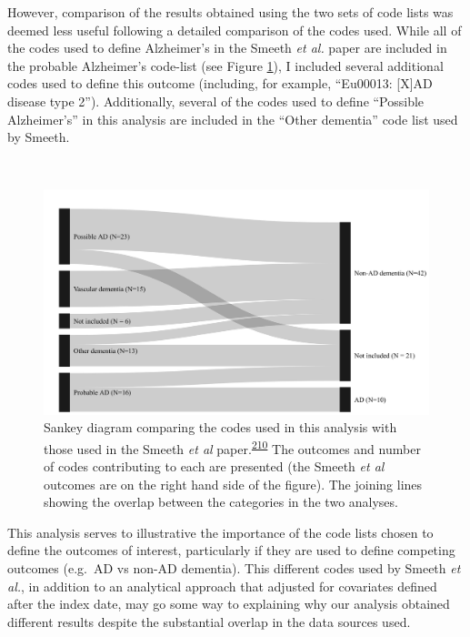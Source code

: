 \documentclass[a4paper, twoside]{templates/ociamthesis}
\begin{document}
However, comparison of the results obtained using the two sets of code lists was deemed less useful following a detailed comparison of the codes used. While all of the codes used to define Alzheimer's in the Smeeth \emph{et al.} paper are included in the probable Alzheimer's code-list (see Figure \ref{fig:smeethComparison}), I included several additional codes used to define this outcome (including, for example, ``Eu00013: {[}X{]}AD disease type 2''). Additionally, several of the codes used to define ``Possible Alzheimer's'' in this analysis are included in the ``Other dementia'' code list used by Smeeth.

~





\begin{figure}[H]
\includegraphics[width=1\linewidth]{figures/cprd-analysis/sankey_diagram} \caption[Comparison of code used in this analysis with those used in the Smeeth et al.~2010 paper]{Sankey diagram comparing the codes used in this analysis with those used in the Smeeth \emph{et al} paper.\textsuperscript{\protect\hyperlink{ref-smeeth2009}{210}} The outcomes and number of codes contributing to each are presented (the Smeeth \emph{et al} outcomes are on the right hand side of the figure). The joining lines showing the overlap between the categories in the two analyses.}\label{fig:smeethComparison}
\end{figure}

This analysis serves to illustrative the importance of the code lists chosen to define the outcomes of interest, particularly if they are used to define competing outcomes (e.g.~AD vs non-AD dementia). This different codes used by Smeeth \emph{et al.}, in addition to an analytical approach that adjusted for covariates defined after the index date, may go some way to explaining why our analysis obtained different results despite the substantial overlap in the data sources used.
\end{document}
